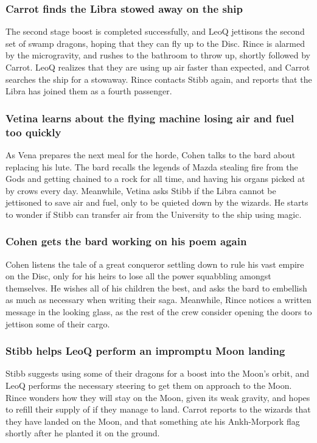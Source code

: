 \subsubsection{\Gls{Carrot} finds the \Gls{Libra} stowed away on the ship}
The second stage boost is completed successfully, and \Gls{LeoQ} jettisons the second set of
swamp dragons, hoping that they can fly up to the Disc. \Gls{Rince} is alarmed by the microgravity,
and rushes to the bathroom to throw up, shortly followed by \Gls{Carrot}. \Gls{LeoQ} realizes that
they are using up air faster than expected, and \Gls{Carrot} searches the ship for a stowaway.
\Gls{Rince} contacts \Gls{Stibb} again, and reports that the \Gls{Libra} has joined them as a fourth
passenger.

\subsubsection{\Gls{Vetina} learns about the flying machine losing air and fuel too quickly}
As \Gls{Vena} prepares the next meal for the horde, \Gls{Cohen} talks to the bard about replacing
his lute. The bard recalls the legends of \Gls{Mazda} stealing fire from the Gods and getting
chained to a rock for all time, and having his organs picked at by crows every day. Meanwhile,
\Gls{Vetina} asks \Gls{Stibb} if the \Gls{Libra} cannot be jettisoned to save air and fuel, only to
be quieted down by the wizards. He starts to wonder if \Gls{Stibb} can transfer air from the
University to the ship using magic.

\subsubsection{\Gls{Cohen} gets the bard working on his poem again}
\Gls{Cohen} listens the tale of a great conqueror settling down to rule his vast empire on the Disc,
only for his heirs to lose all the power squabbling amongst themselves. He wishes all of his
children the best, and asks the bard to embellish as much as necessary when writing their saga.
Meanwhile, \Gls{Rince} notices a written message in the looking glass, as the rest of the crew
consider opening the doors to jettison some of their cargo.

\subsubsection{\Gls{Stibb} helps \Gls{LeoQ} perform an impromptu Moon landing}
\Gls{Stibb} suggests using some of their dragons for a boost into the Moon's orbit, and \Gls{LeoQ}
performs the necessary steering to get them on approach to the Moon. \Gls{Rince} wonders how they
will stay on the Moon, given its weak gravity, and hopes to refill their supply of if they manage to
land. \Gls{Carrot} reports to the wizards that they have landed on the Moon, and that something
ate his Ankh-Morpork flag shortly after he planted it on the ground.

